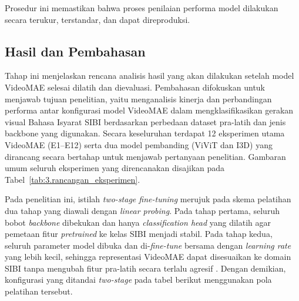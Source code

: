 Prosedur ini memastikan bahwa proses penilaian performa model dilakukan secara terukur, terstandar, dan dapat direproduksi.\par

\subsection{Hasil dan Pembahasan} \label{III.Hasil_dan_Pembahasan}
Tahap ini menjelaskan rencana analisis hasil yang akan dilakukan setelah model VideoMAE selesai dilatih dan dievaluasi. Pembahasan difokuskan untuk menjawab tujuan penelitian, yaitu menganalisis kinerja dan perbandingan performa antar konfigurasi model VideoMAE dalam mengklasifikasikan gerakan visual Bahasa Isyarat SIBI berdasarkan perbedaan dataset pra-latih dan jenis backbone yang digunakan. Secara keseluruhan terdapat 12 eksperimen utama VideoMAE (E1--E12) serta dua model pembanding (ViViT dan I3D) yang dirancang secara bertahap untuk menjawab pertanyaan penelitian. Gambaran umum seluruh eksperimen yang direncanakan disajikan pada Tabel~\ref{tab:3.rancangan_eksperimen}.\par

Pada penelitian ini, istilah \textit{two-stage fine-tuning} merujuk pada skema pelatihan dua tahap yang diawali dengan \textit{linear probing}. Pada tahap pertama, seluruh bobot \textit{backbone} dibekukan dan hanya \textit{classification head} yang dilatih agar pemetaan fitur \textit{pretrained} ke kelas SIBI menjadi stabil. Pada tahap kedua, seluruh parameter model dibuka dan di-\textit{fine-tune} bersama dengan \textit{learning rate} yang lebih kecil, sehingga representasi VideoMAE dapat disesuaikan ke domain SIBI tanpa mengubah fitur pra-latih secara terlalu agresif \cite{Kumar2022,Tomihari2024}. Dengan demikian, konfigurasi yang ditandai \textit{two-stage} pada tabel berikut menggunakan pola pelatihan tersebut.\par

